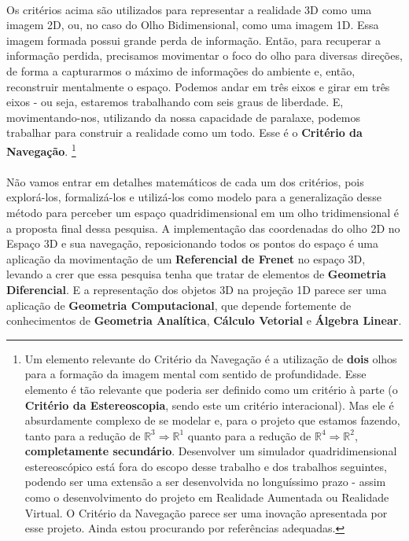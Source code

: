 \documentclass{article}
\newcommand\R{\mathbb{R}}
\begin{document}
	\paragraph{}
	Os critérios acima são utilizados para representar a realidade 3D como uma imagem 2D, ou, no caso do Olho Bidimensional, como uma imagem 1D. Essa imagem formada possui grande perda de informação. Então, para recuperar a informação perdida, precisamos movimentar o foco do olho para diversas direções, de forma a capturarmos o máximo de informações do ambiente e, então, reconstruir mentalmente o espaço. Podemos andar em três eixos e girar em três eixos - ou seja, estaremos trabalhando com seis graus de liberdade. E, movimentando-nos, utilizando da nossa capacidade de paralaxe, podemos trabalhar para construir a realidade como um todo. Esse é o \textbf{Critério da Navegação}. \footnote{Um elemento relevante do Critério da Navegação é a utilização de \textbf{dois} olhos para a formação da imagem mental com sentido de profundidade. Esse elemento é tão relevante que poderia ser definido como um critério à parte (o \textbf{Critério da Estereoscopia}, sendo este um critério interacional). Mas ele é absurdamente complexo de se modelar e, para o projeto que estamos fazendo, tanto para a redução de $\R^3 \Rightarrow \R^1$ quanto para a redução de $\R^4 \Rightarrow \R^2$, \textbf{completamente secundário}. Desenvolver um simulador quadridimensional estereoscópico está fora do escopo desse trabalho e dos trabalhos seguintes, podendo ser uma extensão a ser desenvolvida no longuíssimo prazo - assim como o desenvolvimento do projeto em Realidade Aumentada ou Realidade Virtual. O Critério da Navegação parece ser uma inovação apresentada por esse projeto. Ainda estou procurando por referências adequadas.}
	
	\paragraph{}
	Não vamos entrar em detalhes matemáticos de cada um dos critérios, pois explorá-los, formalizá-los e utilizá-los como modelo para a generalização desse método para perceber um espaço quadridimensional em um olho tridimensional é a proposta final dessa pesquisa. A implementação das coordenadas do olho 2D no Espaço 3D e sua navegação, reposicionando todos os pontos do espaço é uma aplicação da movimentação de um \textbf{Referencial de Frenet} no espaço 3D, levando a crer que essa pesquisa tenha que tratar de elementos de \textbf{Geometria Diferencial}. E a representação dos objetos 3D na projeção 1D parece ser uma aplicação de \textbf{Geometria Computacional}, que depende fortemente de conhecimentos de \textbf{Geometria Analítica}, \textbf{Cálculo Vetorial} e \textbf{Álgebra Linear}.
	
\end{document}
